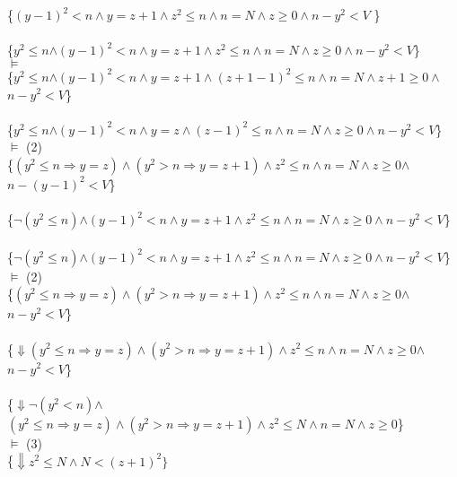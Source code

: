 \documentclass{article}
\begin{document}
\\
 \\
\{$(y-1)^2<n \land y = z+1\land z^2 \leq n \land n=N \land z\geq 0\land$\colorbox{teal!10}{$n-y^2<V$} \}
\\
 \\
\{\colorbox{NavyBlue!10}{$y^2 \leq n$}$\land (y-1)^2<n \land y = z+1\land z^2 \leq n \land n=N \land z\geq 0\land$\colorbox{teal!10}{$n-y^2<V$}\} \\
$\vDash$ \\
\{\colorbox{NavyBlue!10}{$y^2 \leq n$}$\land (y-1)^2<n \land y = z+1\land (z+1-1)^2 \leq n \land n=N \land z+1 \geq 0\land$\colorbox{teal!10}{$n-y^2<V$}\}
\\
 \\
\{\colorbox{NavyBlue!10}{$y^2 \leq n$}$\land (y-1)^2<n \land y = z\land (z-1)^2 \leq n \land n=N \land z \geq 0\land$\colorbox{teal!10}{$n-y^2<V$}\}\\
$\vDash$ (2) \\
\{\colorbox{blue!10}{$(y^2 \leq n \Rightarrow y = z) \land (y^2 > n \Rightarrow y = z + 1) \land z^2 \leq n \land n=N \land z \geq 0$}$\land$\colorbox{teal!10}{$n-(y-1)^2<V$}\}
\\
 \\
\{\colorbox{NavyBlue!10}{$\lnot(y^2 \leq n)$}$\land (y-1)^2<n \land y = z+ 1 \land z^2 \leq n \land n=N \land z \geq 0\land$\colorbox{teal!10}{$n-y^2<V$}\}
\\
 \\
\{\colorbox{NavyBlue!10}{$\lnot(y^2 \leq n)$}$\land (y-1)^2<n \land y = z+ 1 \land z^2 \leq n \land n=N \land z \geq 0\land$\colorbox{teal!10}{$n-y^2<V$}\}\\
$\vDash$ (2) \\
\{\colorbox{blue!10}{$(y^2 \leq n \Rightarrow y = z) \land (y^2 > n \Rightarrow y = z + 1) \land z^2 \leq n \land n=N \land z \geq 0$}$\land$\colorbox{teal!10}{$n-y^2<V$}\}
\\
 \\
\{$\Downarrow$\colorbox{blue!10}{$(y^2 \leq n \Rightarrow y = z) \land (y^2 > n \Rightarrow y = z + 1) \land z^2 \leq n \land n=N \land z \geq 0$}$\land$\colorbox{teal!10}{$n-y^2<V$}\}
\\
 \\
\{$\Downarrow$\colorbox{magenta!10}{$\lnot (y^2 < n)$}$\land$\colorbox{blue!10}{$(y^2 \leq n \Rightarrow y = z) \land (y^2 > n \Rightarrow y = z + 1) \land z^2 \leq N \land n=N \land z \geq 0$}\} \\
$\vDash$ (3) \\
\{$\Downarrow z^2 \leq N \land N < (z+1)^2\}$
\end{document}
